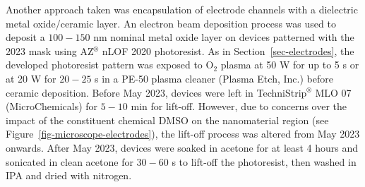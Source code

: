 \documentclass[
  a4paper,
]{scrbook}
\begin{document}
Another approach taken was encapsulation of electrode channels with a
dielectric metal oxide/ceramic layer. An electron beam deposition
process was used to deposit a \(100-150\) nm nominal metal oxide layer
on devices patterned with the 2023 mask using AZ\(^\circledR\) nLOF 2020
photoresist. As in Section~\ref{sec-electrodes}, the developed
photoresist pattern was exposed to O\(_2\) plasma at 50 W for up to 5 s
or at 20 W for \(20-25\) s in a PE-50 plasma cleaner (Plasma Etch, Inc.)
before ceramic deposition. Before May 2023, devices were left in
TechniStrip\(^\circledR\) MLO 07 (MicroChemicals) for \(5-10\) min for
lift-off. However, due to concerns over the impact of the constituent
chemical DMSO on the nanomaterial region (see
Figure~\ref{fig-microscope-electrodes}), the lift-off process was
altered from May 2023 onwards. After May 2023, devices were soaked in
acetone for at least 4 hours and sonicated in clean acetone for
\(30-60\) s to lift-off the photoresist, then washed in IPA and dried
with nitrogen.
\end{document}
